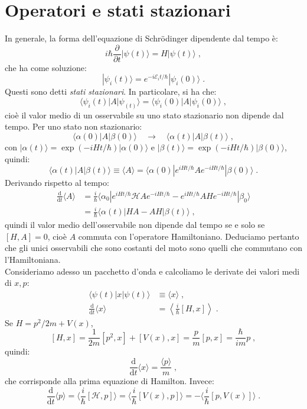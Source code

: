 \documentclass[10pt,a4paper]{report}
\theoremstyle{definition}
\newcommand{\ham}{\mathcal{H}}
\numberwithin{equation}{section}
\newcommand{\diff}[1][]{\mathrm{d}#1}
\newcommand{\bra}{\langle}
\newcommand{\ket}{\rangle}
\begin{document}
\section{Operatori e stati stazionari}
In generale, la forma dell'equazione di Schrödinger dipendente dal tempo è:
$$
i\hbar\frac{\partial}{\partial t}|\psi(t)\ket=H|\psi(t)\ket\;,
$$
che ha come soluzione:
$$
|\psi_i(t)\ket=e^{-i\mathcal{E}_it/\hbar}|\psi_i(0)\ket\;.
$$
Questi sono detti \textit{stati stazionari}. In particolare, si ha che:
\begin{equation}
\bra\psi_i(t)|A|\psi_(t)\ket=\bra\psi_i(0)|A|\psi_i(0)\ket\;,
\end{equation}
cioè il valor medio di un osservabile su uno stato stazionario non dipende dal tempo. Per uno stato non stazionario:
$$
\bra\alpha(0)|A|\beta(0)\ket \quad \longrightarrow\quad \bra\alpha(t)|A|\beta(t)\ket\;,
$$
con $|\alpha(t)\ket=\exp(-iH t/\hbar)|\alpha(0)\ket$ e $|\beta(t)\ket=\exp(-iH t/\hbar)|\beta(0)\ket$, quindi:
$$
\bra\alpha(t)|A|\beta(t)\ket\equiv \bra A\ket =\bra\alpha(0)|e^{iH t/\hbar}Ae^{-iH t/\hbar}|\beta(0)\ket\;.
$$
Derivando rispetto al tempo:
\begin{align*}
\frac{\mathrm{d}}{\diff{t}}\bra A\ket &= \frac{i}{\hbar}\bra \alpha_0|e^{iH t/\hbar}\ham Ae^{-iH t/\hbar}-e^{iH t/\hbar}AH e^{-iH t/\hbar}|\beta_0\ket \\
&= \frac{i}{\hbar}\bra\alpha(t)|H A-AH|\beta(t)\ket\;,
\end{align*}
quindi il valor medio dell'osservabile non dipende dal tempo se e solo se $[H,A]=0$, cioè $A$ commuta con l'operatore Hamiltoniano. Deduciamo pertanto che gli unici osservabili che sono costanti del moto sono quelli che commutano con l'Hamiltoniana. \\
Consideriamo adesso un pacchetto d'onda e calcoliamo le derivate dei valori medi di $x,p$:
\begin{align*}
\bra\psi(t)|x|\psi(t)\ket &\equiv \bra x\ket\;, \\
\frac{\mathrm{d}}{\mathrm{d}t}\bra x\ket&=\left\langle\frac{i}{\hbar}[H,x]\right\rangle\;.
\end{align*}
Se $H=p^2/2m+V(x)$,
$$
[H,x]=\frac{1}{2m}[p^2,x]+[V(x),x]=\frac{p}{m}[p,x]=\frac{\hbar}{im}p\;,
$$
quindi:
\begin{equation}
\frac{\mathrm{d}}{\diff{t}}\bra x \ket=\frac{\bra p\ket}{m}\;,
\end{equation}
che corrisponde alla prima equazione di Hamilton. Invece:
$$
\frac{\mathrm{d}}{\diff{t}}\bra p\ket=\bra\frac{i}{\hbar}[\ham,p]\ket=\bra \frac{i}{\hbar}[V(x),p]\ket=
-\bra\frac{i}{\hbar}[p,V(x)]\ket\;.
$$
\end{document}
